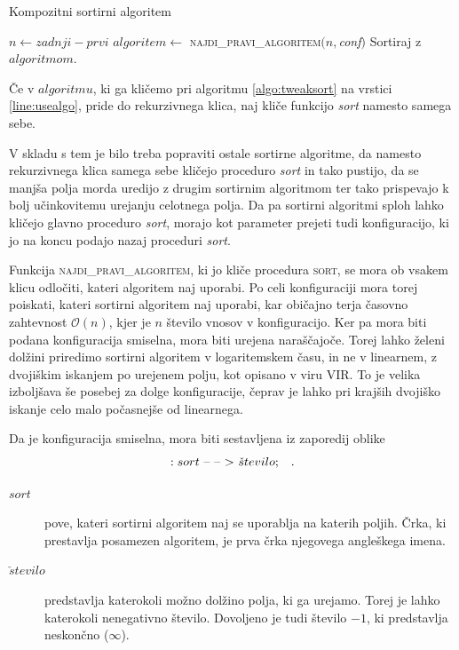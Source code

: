 \documentclass[a4paper,oneside,12pt]{article}
\newcommand{\konfarrow}{\mbox{--}~\mbox{--}~\mbox{\ensuremath{>}}}
\newcommand{\edot}{\;\;\;.}
\begin{document}
\begin{algorithm}
  \caption{Kompozitni sortirni algoritem}\label{algo:tweaksort}
  \begin{algorithmic}[1]
        \State $n \gets zadnji - prvi$
        \State $algoritem \gets$ \textsc{najdi\_pravi\_algoritem}$(n, $\emph{conf}$)$
        \State \label{line:usealgo}Sortiraj z $algoritmom$.
    \EndFunction
  \end{algorithmic}
\end{algorithm}

Če v $algoritmu$, ki ga kličemo pri algoritmu \ref{algo:tweaksort} na vrstici
\ref{line:usealgo}, pride do rekurzivnega klica, naj kliče funkcijo \emph{sort} namesto
samega sebe.

V skladu s tem je bilo treba popraviti ostale sortirne algoritme, da namesto rekurzivnega
klica samega sebe kličejo proceduro \emph{sort} in tako pustijo, da se manjša polja morda uredijo z
drugim sortirnim algoritmom ter tako prispevajo k bolj učinkovitemu urejanju celotnega polja. Da pa
sortirni algoritmi sploh lahko kličejo glavno proceduro \emph{sort}, morajo kot
parameter prejeti tudi konfiguracijo, ki jo na koncu podajo nazaj proceduri \emph{sort}.

Funkcija \textsc{najdi\_pravi\_algoritem}, ki jo kliče procedura \textsc{sort}, se mora ob vsakem klicu odločiti, kateri
algoritem naj uporabi. Po celi konfiguraciji mora torej poiskati, kateri sortirni algoritem
naj uporabi, kar običajno terja časovno zahtevnost
$\mathcal{O}(n)$, kjer je $n$ število vnosov v konfiguracijo. Ker pa mora biti podana konfiguracija
smiselna, mora biti urejena naraščajoče. Torej lahko želeni dolžini priredimo sortirni
algoritem v logaritemskem času, in ne v linearnem, z dvojiškim iskanjem po urejenem polju, 
kot opisano v viru VIR. To je velika izboljšava še posebej za dolge konfiguracije, čeprav je lahko
pri krajših dvojiško iskanje celo malo počasnejše od linearnega.

Da je konfiguracija smiselna, mora biti sestavljena iz zaporedij oblike
\[ :sort\ \konfarrow\ \check{s}tevilo; \edot\]
\begin{description}
  \item[$sort$] pove, kateri sortirni algoritem naj se uporablja na katerih poljih. Črka, ki
    prestavlja posamezen algoritem, je prva črka njegovega angleškega imena.
  \item[$\check{s}tevilo$] predstavlja katerokoli možno dolžino polja, ki ga urejamo. Torej je lahko
    katerokoli nenegativno število. Dovoljeno je tudi število $-1$, ki predstavlja neskončno
($\infty$).
\end{description}
\end{document}
